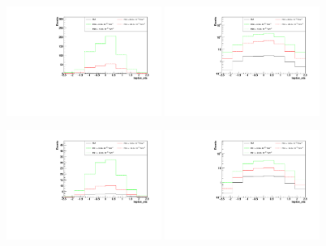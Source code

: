 \begin{figure}[h]
  \begin{center}
	\includegraphics[width=0.45\textwidth]{Plots/aQGC_kinematics/lepton_eta_FS0.pdf}%
	\includegraphics[width=0.45\textwidth]{Plots/aQGC_kinematics/lepton_eta_FS0_log.pdf}\\				
    \caption{}
  \end{center}
\end{figure}

\begin{figure}[h]
  \begin{center}
	\includegraphics[width=0.45\textwidth]{Plots/aQGC_kinematics/lepton_eta_FS1.pdf}%
	\includegraphics[width=0.45\textwidth]{Plots/aQGC_kinematics/lepton_eta_FS1_log.pdf}\\				
    \caption{}
  \end{center}
\end{figure}

